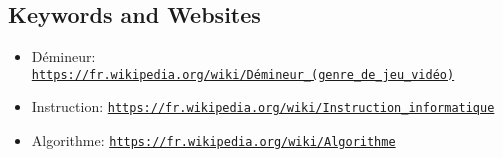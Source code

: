 \documentclass[a4paper,11pt]{report}
\newcommand{\BrochureUrlText}[1]{\texttt{#1}}
\begin{document}
{\raggedright

\subsection*{Keywords and Websites}

\begin{itemize}
  \item Démineur: \href{https://fr.wikipedia.org/wiki/D\%C3\%A9mineur_(genre_de_jeu_vid\%C3\%A9o)}{\BrochureUrlText{https://fr.wikipedia.org/wiki/Démineur\_(genre\_de\_jeu\_vidéo)}}
  \item Instruction: \href{https://fr.wikipedia.org/wiki/Instruction_informatique}{\BrochureUrlText{https://fr.wikipedia.org/wiki/Instruction\_informatique}}
  \item Algorithme: \href{https://fr.wikipedia.org/wiki/Algorithme}{\BrochureUrlText{https://fr.wikipedia.org/wiki/Algorithme}}
\end{itemize}


}
\end{document}
